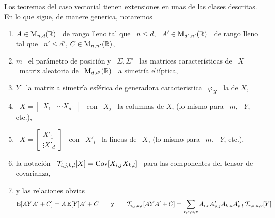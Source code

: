 Los  teoremas  del caso  vectorial  tienen extensiones  en  unas  de las  clases
descritas. En lo que sigue, de manere generica, notaremos
%
\begin{enumerate}
\item $A \in \mathrm{M}_{n,d}(\mathbb{R})$ \ de rango lleno  tal que \ $n \le d$, \ $A' \in
  \mathrm{M}_{d',n'}(\mathbb{R})$  \  de  rango  lleno  tal  que \  $n'  \le  d'$,  $C  \in
  \mathrm{M}_{n,n'}(\mathbb{R})$,
%
\item $m$  \ el par\'ametro de posici\'on  y \ $\Sigma, \Sigma'$  \ las matrices
  caracter\'isticas de  \ $X$ \ matriz  aleatoria de \  $\mathrm{M}_{d,d'}(\mathbb{R})$ \ a
  simetr\'ia eli\'iptica,
%
\item $Y$  \ la  matriz a simetr\'ia  esf\'erica de generadora  caracteristica \
  $\varphi_X$ \ la de $X$,
%
\item \ $X = \begin{bmatrix} X_1 &  \cdots X_{d'} \end{bmatrix}$ \ con \ $X_j$ \
  la columnas de $X$, (lo mismo para \ $m$, \ $Y$, etc.),
%
\item \ $X = \begin{bmatrix} X'_1 \\ \vdots X'_d \end{bmatrix}$ \ con \ $X'_i$ \
  la lineas de \ $X$, (lo mismo para \ $m$, \ $Y$, etc.),
%
\item  la notaci\'on \  $\mathcal{T}_{i,j,k,l}[X] =  \operatorname{Cov}[ X_{i,j}  X_{k,l}]$ \  para las
  componentes del tensor de covarianza,
%
\item\label{Enum:MP:RelacionesObvias} y las relaciones obvias
%
\[
\operatorname{E}[ A Y A' + C] = A  \operatorname{E}[Y] A' + C \qquad \mbox{y} \qquad \mathcal{T}_{i,j,k,l}[ A Y
A' + C] = \sum_{r,s,u,v} A_{i,r} A'_{s,j} A_{k,u} A'_{v,l} \, \mathcal{T}_{r,s,u,v}[Y]
\]
\end{enumerate}
%
